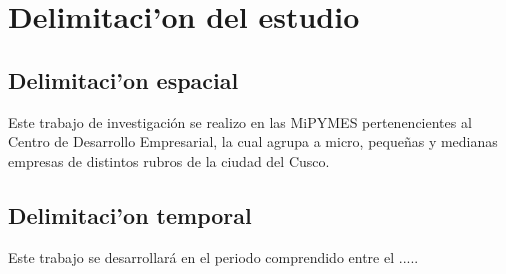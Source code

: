 \section{Delimitaci'on del estudio}
\subsection{Delimitaci'on espacial}
Este trabajo de investigaci\'on se realizo en las MiPYMES pertenencientes al
Centro de Desarrollo Empresarial, la cual agrupa a micro, peque\~nas y
medianas empresas de distintos rubros de la ciudad del Cusco.

\subsection{Delimitaci'on temporal}
Este trabajo se desarrollar\'a en el periodo comprendido entre el .....
